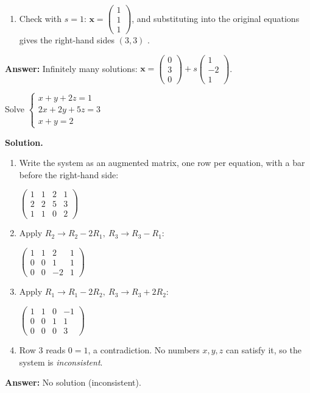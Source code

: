 \documentclass[11pt]{article}
\begin{document}
\begin{tcolorbox}[breakable,colback=white,colframe=ink!60,title={\bfseries Example 3 \textperiodcentered\ A system with infinitely many solutions}]
\begin{enumerate}[leftmargin=1.6em,itemsep=1pt,topsep=2pt,label=\arabic*.]
\item Check with $s=1$: $\mathbf x=\begin{pmatrix}1\\1\\1\end{pmatrix}$, and substituting into the original equations gives the right-hand sides $(3,3)$ \checkmark.
\end{enumerate}\textbf{Answer:} Infinitely many solutions: $\mathbf x=\begin{pmatrix}0\\3\\0\end{pmatrix}+s\begin{pmatrix}1\\-2\\1\end{pmatrix}$.
\end{tcolorbox}
\begin{tcolorbox}[breakable,colback=white,colframe=ink!60,title={\bfseries Example 4 \textperiodcentered\ An inconsistent system}]Solve $\begin{cases}x+y+2z=1\\ 2x+2y+5z=3\\ x+y=2\end{cases}$
\par\smallskip
\textbf{Solution.} \begin{enumerate}[leftmargin=1.6em,itemsep=1pt,topsep=2pt,label=\arabic*.]\item Write the system as an augmented matrix, one row per equation, with a bar before the right-hand side:\par\smallskip $\displaystyle \left(\begin{array}{ccc|c}1 & 1 & 2 & 1 \\ 2 & 2 & 5 & 3 \\ 1 & 1 & 0 & 2\end{array}\right)$
\item Apply $R_2\to R_2-2R_1,\ R_3\to R_3-R_1$:\par\smallskip $\displaystyle \left(\begin{array}{ccc|c}1 & 1 & 2 & 1 \\ 0 & 0 & 1 & 1 \\ 0 & 0 & -2 & 1\end{array}\right)$
\item Apply $R_1\to R_1-2R_2,\ R_3\to R_3+2R_2$:\par\smallskip $\displaystyle \left(\begin{array}{ccc|c}1 & 1 & 0 & -1 \\ 0 & 0 & 1 & 1 \\ 0 & 0 & 0 & 3\end{array}\right)$
\item Row 3 reads $0=1$, a contradiction. No numbers $x,y,z$ can satisfy it, so the system is \emph{inconsistent}.
\end{enumerate}\textbf{Answer:} No solution (inconsistent).
\end{tcolorbox}
\end{document}
